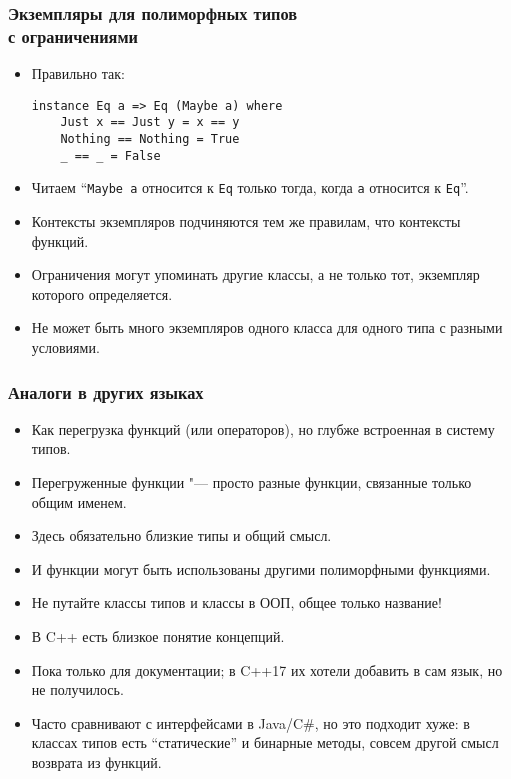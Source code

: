 \documentclass[10pt]{beamer}
\begin{document}
\begin{frame}[fragile]
\frametitle{Экземпляры для полиморфных типов \\с ограничениями}
\begin{itemize}
    \item Правильно так:
\begin{lstlisting}
instance Eq a => Eq (Maybe a) where
    Just x == Just y = x == y
    Nothing == Nothing = True
    _ == _ = False
\end{lstlisting} 
    \item Читаем \enquote{\lstinline|Maybe a| относится к \lstinline|Eq| только тогда, когда \lstinline|a| относится к \lstinline|Eq|}.
    \item Контексты экземпляров подчиняются тем же правилам, что контексты функций.
    \item Ограничения могут упоминать другие классы, а не только тот, экземпляр которого определяется.
    \item Не может быть много экземпляров одного класса для одного типа с разными условиями.
\end{itemize}
\end{frame}

\begin{frame}[fragile]
\frametitle{Аналоги в других языках}
\begin{itemize}
    \item Как перегрузка функций (или операторов), но глубже встроенная в систему типов.
    \item Перегруженные функции "--- просто разные функции, связанные только общим именем.
    \item Здесь обязательно близкие типы и общий смысл.
    \item И функции могут быть использованы другими полиморфными функциями. \pause
    \item Не путайте классы типов и классы в ООП, общее только название!
    \item В C++ есть близкое понятие концепций. \pause
    \item Пока только для документации\pause; в C++17 их хотели добавить в сам язык, но не получилось. \pause
    \item Часто сравнивают с интерфейсами в Java/C\#, но это подходит хуже: \pause в классах типов есть \enquote{статические} и бинарные методы, совсем другой смысл возврата из функций.
\end{itemize}
\end{frame}
\end{document}
